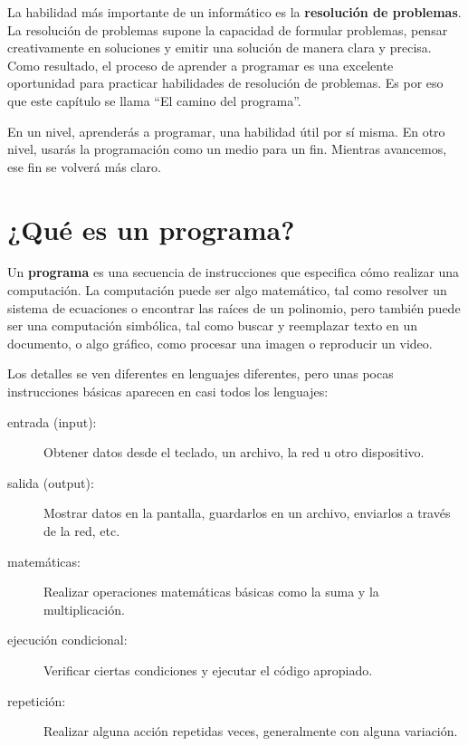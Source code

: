 \documentclass[10pt]{book}
\begin{document}
La habilidad más importante de un informático es la {\bf resolución
 de problemas}.  La resolución de problemas supone la capacidad de
 formular problemas, pensar creativamente en soluciones y emitir una solución
de manera clara y precisa.  Como resultado, el proceso de aprender a
programar es una excelente oportunidad para practicar habilidades de
resolución de problemas.  Es por eso que este capítulo se llama ``El camino del
programa''.

En un nivel, aprenderás a programar, una habilidad útil por
sí misma.  En otro nivel, usarás la programación como un medio para un
fin.  Mientras avancemos, ese fin se volverá más claro.


\section{¿Qué es un programa?}

Un {\bf programa} es una secuencia de instrucciones que especifica cómo
realizar una computación.  La computación puede ser algo matemático,
tal como resolver un sistema de ecuaciones o encontrar las raíces de un
polinomio, pero también puede ser una computación simbólica, tal como
buscar y reemplazar texto en un documento, o algo gráfico, como procesar
una imagen o reproducir un video.

Los detalles se ven diferentes en lenguajes diferentes, pero unas pocas
instrucciones básicas aparecen en casi todos los lenguajes:

\begin{description}

\item[entrada ({input}):] Obtener datos desde el teclado, un archivo, la red u
otro dispositivo.

\item[salida ({output}):] Mostrar datos en la pantalla, guardarlos en un
archivo, enviarlos a través de la red, etc.

\item[matemáticas:] Realizar operaciones matemáticas básicas como la suma y
la multiplicación.

\item[ejecución condicional:] Verificar ciertas condiciones y
ejecutar el código apropiado.

\item[repetición:] Realizar alguna acción repetidas veces, generalmente con
alguna variación.

\end{description}
\end{document}
